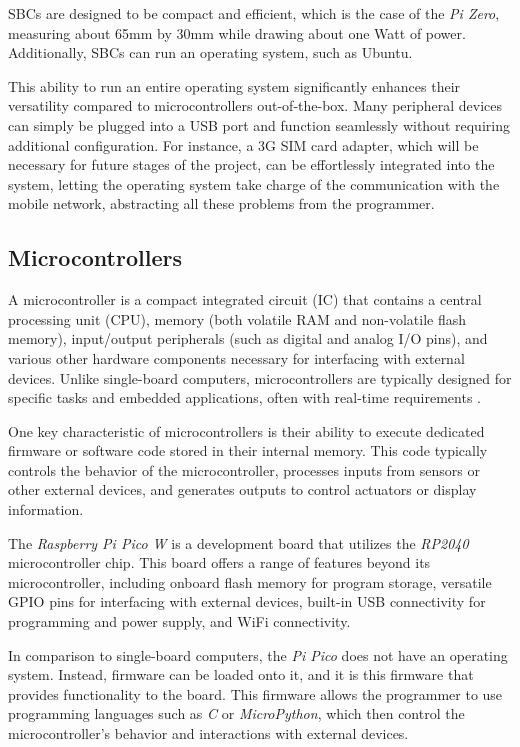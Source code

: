 SBCs are designed to be compact and efficient, which is the case of the \textit{Pi Zero}, measuring about 65mm by 
30mm while drawing about one Watt of power. Additionally, SBCs can run an operating system, such as Ubuntu.

This ability to run an entire operating system significantly enhances their versatility compared to microcontrollers 
out-of-the-box. Many peripheral devices can simply be plugged into a USB port and function seamlessly without 
requiring additional configuration. For instance, a 3G SIM card adapter, which will be necessary for future stages 
of the project, can be effortlessly integrated into the system, letting the operating system take charge of the 
communication with the mobile network, abstracting all these problems from the programmer.


%
%
\subsection{Microcontrollers}

A microcontroller is a compact integrated circuit (IC) that contains a central processing unit (CPU), memory (both 
volatile RAM and non-volatile flash memory), input/output peripherals (such as digital and analog I/O pins), and 
various other hardware components necessary for interfacing with external devices. Unlike single-board computers, 
microcontrollers are typically designed for specific tasks and embedded applications, often with real-time requirements
\cite{microcontroller_vs_sbc}.

One key characteristic of microcontrollers is their ability to execute dedicated firmware or software code stored in 
their internal memory. This code typically controls the behavior of the microcontroller, processes inputs from sensors 
or other external devices, and generates outputs to control actuators or display information.

The \textit{Raspberry Pi Pico W} is a development board that utilizes the \textit{RP2040} microcontroller chip. This board 
offers a range of features beyond its microcontroller, including onboard flash memory for program storage, versatile 
GPIO pins for interfacing with external devices, built-in USB connectivity for programming and power supply, and 
WiFi connectivity.

In comparison to single-board computers, the \textit{Pi Pico} does not have an operating system. Instead, firmware can be 
loaded onto it, and it is this firmware that provides functionality to the board. This firmware allows the programmer to 
use programming languages such as \textit{C} or \textit{MicroPython}, which then control the microcontroller's behavior and 
interactions with external devices.

